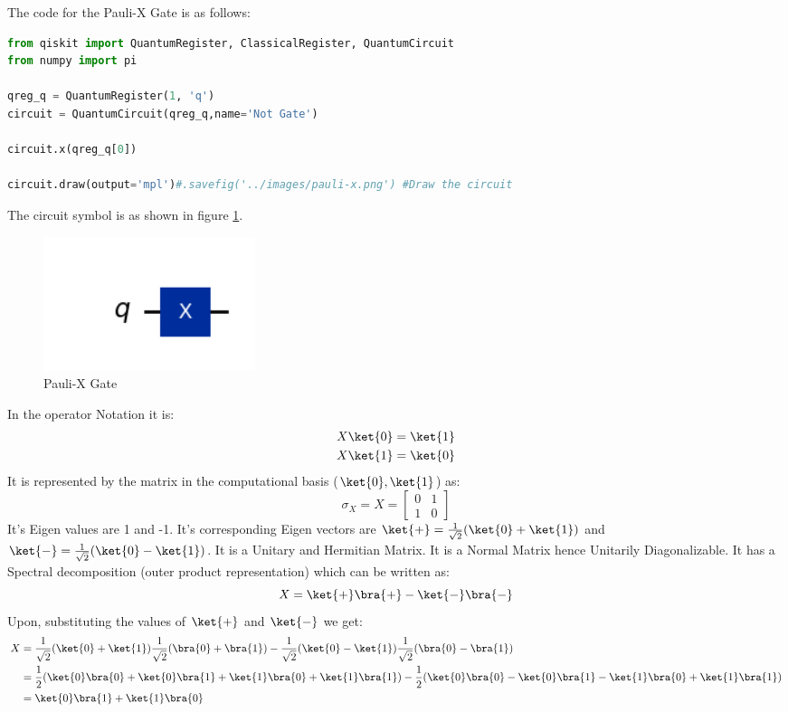\documentclass[12pt, oneside]{book}
\theoremstyle{definition}
\theoremstyle{definition}
\theoremstyle{remark}
\begin{document}
The code for the Pauli-X Gate is as follows:
\begin{lstlisting}[language=Python]
from qiskit import QuantumRegister, ClassicalRegister, QuantumCircuit
from numpy import pi

qreg_q = QuantumRegister(1, 'q')
circuit = QuantumCircuit(qreg_q,name='Not Gate')

circuit.x(qreg_q[0])

circuit.draw(output='mpl')#.savefig('../images/pauli-x.png') #Draw the circuit
\end{lstlisting}
The circuit symbol is as shown in figure \ref{fig:pauli-x}.
\begin{figure}[H]
    \centering
    \includegraphics[width=0.3\textwidth]{../images/pauli-x.png}
    \caption{Pauli-X Gate}
    \label{fig:pauli-x}
\end{figure}
In the operator Notation it is:
\begin{align*}
    X\ket{0}&=\ket{1} \\
    X\ket{1}&=\ket{0}
\end{align*}
It is represented by the matrix in the computational basis ($\ket{0},\ket{1}$) as:
\[
    \sigma_X=X=\begin{bmatrix}
        0 & 1 \\
        1 & 0
    \end{bmatrix}
\]
It's Eigen values are 1 and -1. It's corresponding Eigen vectors are $\ket{+}=\frac{1}{\sqrt{2}}(\ket{0}+\ket{1})$ and $\ket{-}=\frac{1}{\sqrt{2}}(\ket{0}-\ket{1})$.
It is a Unitary and Hermitian Matrix. It is a Normal Matrix hence Unitarily Diagonalizable.
It has a Spectral decomposition (outer product representation) which can be written as:
\[
    X=\ket{+}\bra{+}-\ket{-}\bra{-}
\]
Upon, substituting the values of $\ket{+}$ and $\ket{-}$ we get:
\begin{align*}
    X&=\dfrac{1}{\sqrt{2}}(\ket{0}+\ket{1})\dfrac{1}{\sqrt{2}}(\bra{0}+\bra{1})-\dfrac{1}{\sqrt{2}}(\ket{0}-\ket{1})\dfrac{1}{\sqrt{2}}(\bra{0}-\bra{1})\\
    &=\dfrac{1}{2}(\ket{0}\bra{0}+\ket{0}\bra{1}+\ket{1}\bra{0}+\ket{1}\bra{1})-\dfrac{1}{2}(\ket{0}\bra{0}-\ket{0}\bra{1}-\ket{1}\bra{0}+\ket{1}\bra{1})\\
    &=\ket{0}\bra{1}+\ket{1}\bra{0}
\end{align*}
\end{document}
